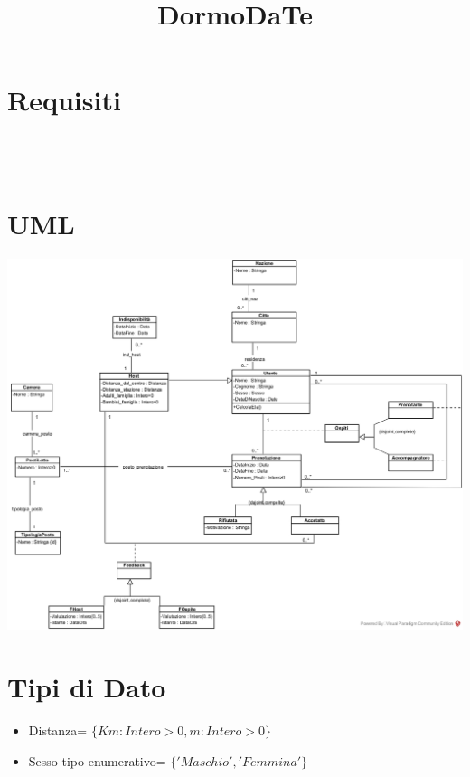 \documentclass[12pt, letterpaper]{article}
\title{\textbf{DormoDaTe}}
\date{}
\begin{document}
\maketitle

\tableofcontents 
\newpage
\section{Requisiti}
\begin{verbatim}
  


\end{verbatim}
\newpage\section{UML}
\begin{center}
    \includegraphics[width=1\textwidth ]{Images/UML.jpg}
\end{center} 
\newpage
\section{Tipi di Dato}
\begin{itemize}
    \item Distanza= $\{Km: Intero>0, m: Intero>0 \}$
    \item Sesso tipo enumerativo= $\{'Maschio', 'Femmina'\}$
\end{itemize}
\end{document}
